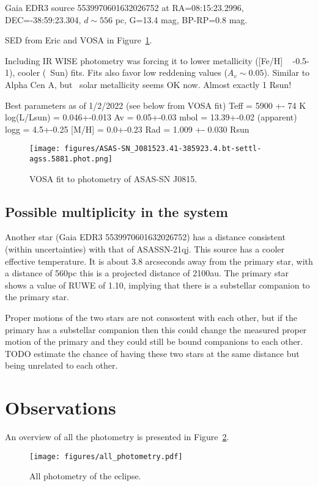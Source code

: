 \documentclass{aa}
\begin{document}
Gaia EDR3 source 5539970601632026752 at RA=08:15:23.2996, DEC=-38:59:23.304, $d\sim 556$ pc, G=13.4 mag, BP-RP=0.8 mag.

SED from Eric and VOSA in Figure~\ref{fig:sed}.

 Including IR WISE photometry
was forcing it to lower metallicity ([Fe/H] ~ -0.5-1), cooler (~Sun) fits. Fits also favor low reddening values ($A_v\sim 0.05$). 
Similar to Alpha Cen A, but ~solar metallicity seems OK now. Almost exactly 1 Rsun! 

Best parameters as of 1/2/2022 (see below from VOSA fit) 
Teff = 5900 +- 74 K
log(L/Lsun) = 0.046+-0.013 
Av = 0.05+-0.03
mbol = 13.39+-0.02 (apparent)
logg = 4.5+-0.25
[M/H] = 0.0+-0.23 
Rad = 1.009 +- 0.030 Rsun


\begin{figure}
   \centering
   \texttt{[image: figures/ASAS-SN\_J081523.41-385923.4.bt-settl-agss.5881.phot.png]}
      \caption{VOSA fit to photometry of ASAS-SN J0815.}
         \label{fig:sed}
\end{figure}

\subsection{Possible multiplicity in the  system}

Another star (Gaia EDR3 5539970601632026752) has a distance consistent (within uncertainties) with that of ASASSN-21qj.
%
This source has a cooler effective temperature.
%
It is about 3.8 arcseconds away from the primary star, with a distance of 560pc this is a projected distance of 2100au.
%
The primary star shows a value of RUWE of 1.10, implying that there is a substellar companion to the primary star.

Proper motions of the two stars are not consostent with each other, but if the primary has a substellar companion then this could change the measured proper motion of the primary and they could still be bound companions to each other.
%
TODO estimate the chance of having these two stars at the same distance but being unrelated to each other.




\section{Observations}\label{sec:obs}
An overview of all the photometry is presented in Figure~\ref{fig:allphot}.

\begin{figure}
   \begin{centering}
   \texttt{[image: figures/all\_photometry.pdf]}
      \caption{All photometry of the eclipse.
              }
              \label{fig:allphot}
              \end{centering}
       \end{figure}
\end{document}
